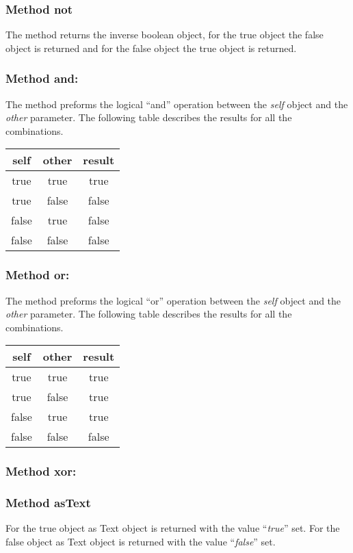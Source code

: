 \subsubsection{Method not}
The method returns the inverse boolean object, for the true object the false
object is returned and for the false object the true object is returned.

\subsubsection{Method and:}
The method preforms the logical ``and'' operation between the \textit{self}
object and the \textit{other} parameter. The following table describes the
results for all the combinations.

\begin{center}
  \begin{tabular}{ | c | c | c | }
    \hline
    \textbf{self} & \textbf{other} & \textbf{result} \\ \hline
    true & true & true \\
    true & false & false \\
    false & true & false \\
    false & false & false \\ \hline
  \end{tabular}
\end{center}

\subsubsection{Method or:}
The method preforms the logical ``or'' operation between the \textit{self}
object and the \textit{other} parameter. The following table describes the
results for all the combinations.

\begin{center}
  \begin{tabular}{ | c | c | c | }
    \hline
    \textbf{self} & \textbf{other} & \textbf{result} \\ \hline
    true & true & true \\
    true & false & true \\
    false & true & true \\
    false & false & false \\ \hline
  \end{tabular}
\end{center}

\subsubsection{Method xor:}

\subsubsection{Method asText}
For the true object as Text object is returned with the value ``\textit{true}''
set. For the false object as Text object is returned with the value
``\textit{false}'' set.
